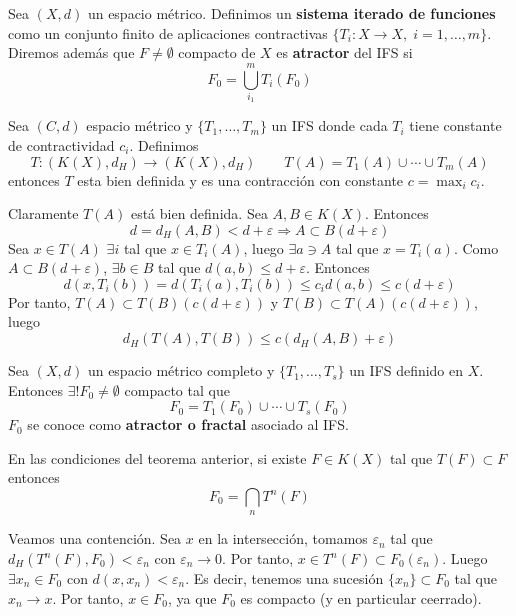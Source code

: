 \documentclass[FyPI.tex]{subfiles}
\begin{document}
\begin{defi} Sea $(X,d)$ un espacio métrico. Definimos un \textbf{sistema iterado de funciones} como un conjunto finito de aplicaciones contractivas $\{T_i:X\to X,\;i=1,\dotsc,m\}$. Diremos además que $F\neq \emptyset$ compacto de $X$ es \textbf{atractor} del IFS si 
$$
F_0 = \bigcup_{i_1}^m T_i(F_0)
$$

\end{defi}
\begin{lema}
Sea $(C,d)$ espacio métrico y $\{T_1,\dotsc,T_m\}$ un IFS donde cada $T_i$ tiene constante de contractividad $c_i$. Definimos
$$
T:(K(X),d_H)\to (K(X),d_H) \qquad T(A) = T_1(A)\cup \cdots \cup T_m(A)
$$
entonces $T$ esta bien definida y es una contracción con constante $c=\max_i c_i$.
\end{lema}
\begin{dem}
Claramente $T(A)$ está bien definida. Sea $A,B\in K(X)$. Entonces
$$
d = d_H(A,B) < d+ \varepsilon \Rightarrow A\subset B(d+\varepsilon)
$$
Sea $x \in T(A)$ $\exists i$ tal que $x \in T_i(A)$, luego $\exists a \ni A$ tal que $x=T_i(a)$. Como $A\subset B(d+\varepsilon)$, $\exists b \in B$ tal que $d(a,b)\leq d+\varepsilon$. Entonces
$$
d(x,T_i(b)) = d(T_i(a),T_i(b)) \leq c_{i} d(a,b) \leq c(d+\varepsilon)
$$
Por tanto, $T(A)\subset T(B)(c(d+\varepsilon))$ y $T(B)\subset T(A)(c(d+\varepsilon))$, luego
$$
d_H(T(A),T(B)) \leq c(d_H(A,B)+\varepsilon)$$
\end{dem}
\begin{theorem}
Sea $(X,d)$ un espacio métrico completo y $\{T_1,\dotsc,T_s\}$ un IFS definido en $X$. Entonces $\exists! F_0 \neq \emptyset$ compacto tal que 
$$
F_0 = T_1(F_0) \cup \cdots \cup T_s(F_0)
$$ 
$F_0$ se conoce como \textbf{atractor o fractal} asociado al IFS.

\end{theorem}
\begin{prop}
En las condiciones del teorema anterior, si existe $F \in K(X)$ tal que $T(F)\subset F$ entonces
$$
F_0  = \bigcap_n T^n (F)
$$
\end{prop}
\begin{dem}
Veamos una contención. Sea $x$ en la intersección, tomamos $\varepsilon_n$ tal que $d_H(T^n(F),F_0)<\varepsilon_n$ con $\varepsilon_n\to0$. Por tanto, $x\in T^n(F)\subset F_0(\varepsilon_n)$. Luego $\exists x_n\in F_0$ con $d(x,x_n)<\varepsilon_n$. Es decir, tenemos una sucesión $\{x_n\}\subset F_0$ tal que $x_n \to x$. Por tanto, $x\in F_0$, ya que $F_0$ es compacto (y en particular ceerrado). 
\end{dem}
\end{document}
